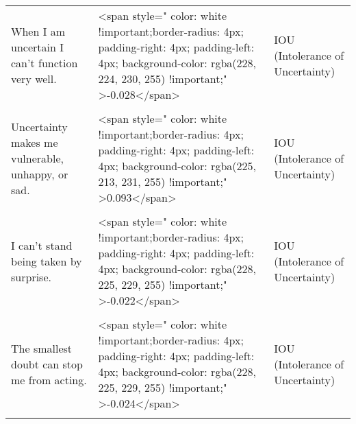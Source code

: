 \documentclass[border=1mm]{standalone}
\begin{document}
\begin{longtable}{lll}
When I am uncertain I can't function very well. & <span style="     color: white !important;border-radius: 4px; padding-right: 4px; padding-left: 4px; background-color: rgba(228, 224, 230, 255) !important;" >-0.028</span> & IOU (Intolerance of Uncertainty)\\
\cellcolor{gray!10}{Unlike me, others always seem to know where they are going with their lives.} & \cellcolor{gray!10}{<span style="     color: white !important;border-radius: 4px; padding-right: 4px; padding-left: 4px; background-color: rgba(229, 227, 229, 255) !important;" >0.013</span>} & \cellcolor{gray!10}{IOU (Intolerance of Uncertainty)}\\
Uncertainty makes me vulnerable, unhappy, or sad. & <span style="     color: white !important;border-radius: 4px; padding-right: 4px; padding-left: 4px; background-color: rgba(225, 213, 231, 255) !important;" >0.093</span> & IOU (Intolerance of Uncertainty)\\
\cellcolor{gray!10}{I always want to know what the future has in store for me.} & \cellcolor{gray!10}{<span style="     color: white !important;border-radius: 4px; padding-right: 4px; padding-left: 4px; background-color: rgba(228, 226, 229, 255) !important;" >0.019</span>} & \cellcolor{gray!10}{IOU (Intolerance of Uncertainty)}\\
\addlinespace
I can't stand being taken by surprise. & <span style="     color: white !important;border-radius: 4px; padding-right: 4px; padding-left: 4px; background-color: rgba(228, 225, 229, 255) !important;" >-0.022</span> & IOU (Intolerance of Uncertainty)\\
\cellcolor{gray!10}{Being uncertain means that a person is disorganized.} & \cellcolor{gray!10}{<span style="     color: white !important;border-radius: 4px; padding-right: 4px; padding-left: 4px; background-color: rgba(223, 206, 232, 255) !important;" >0.135</span>} & \cellcolor{gray!10}{IOU (Intolerance of Uncertainty)}\\
The smallest doubt can stop me from acting. & <span style="     color: white !important;border-radius: 4px; padding-right: 4px; padding-left: 4px; background-color: rgba(228, 225, 229, 255) !important;" >-0.024</span> & IOU (Intolerance of Uncertainty)\\
\cellcolor{gray!10}{I should be able to organize everything in advance.} & \cellcolor{gray!10}{<span style="     color: white !important;border-radius: 4px; padding-right: 4px; padding-left: 4px; background-color: rgba(226, 217, 230, 255) !important;" >0.069</span>} & \cellcolor{gray!10}{IOU (Intolerance of Uncertainty)}\\

\end{longtable}
\end{document}
